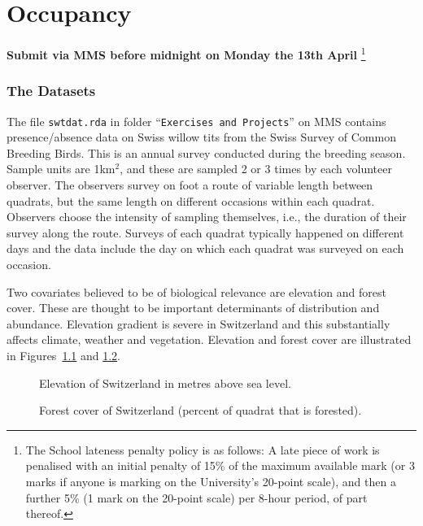 \chapter{Occupancy\label{sec:occ_proj}}


\begin{center}
\textbf{Submit via MMS before midnight on Monday the 13th April }\footnote{The School lateness penalty policy is as follows: A late piece of work is penalised with an initial penalty of 15\% of the maximum available mark (or 3 marks if anyone is marking on the University's 20-point scale), and then a further 5\% (1 mark on the 20-point scale) per 8-hour period, of part thereof.}
\end{center}

\subsection*{The Datasets}

The file \verb|swtdat.rda| in folder ``\verb|Exercises and Projects|'' on MMS contains presence/absence data on Swiss willow tits from the Swiss Survey of Common Breeding Birds. This is an annual survey conducted during the breeding season. Sample units are 1km$^2$, and these are sampled 2 or 3 times by each volunteer observer. The observers survey on foot a route of variable length between quadrats, but the same length on different occasions within each quadrat. Observers choose the intensity of sampling themselves, i.e., the duration of their survey along the route. Surveys of each quadrat typically happened on different days and the data include the day on which each quadrat was surveyed on each occasion.

Two covariates believed to be of biological relevance are elevation and forest cover. These are thought to be important determinants of distribution and abundance. Elevation gradient is severe in Switzerland and this substantially affects climate, weather and vegetation. Elevation and forest cover are illustrated in Figures~\ref{fig:elevation} and \ref{fig:forest}.

\begin{figure}
\caption{Elevation of Switzerland in metres above sea level.\label{fig:elevation}}
\centering
{}
\end{figure}

\begin{figure}
\caption{Forest cover of Switzerland  (percent of quadrat that is forested).\label{fig:forest}}
\centering
{}
\end{figure}

